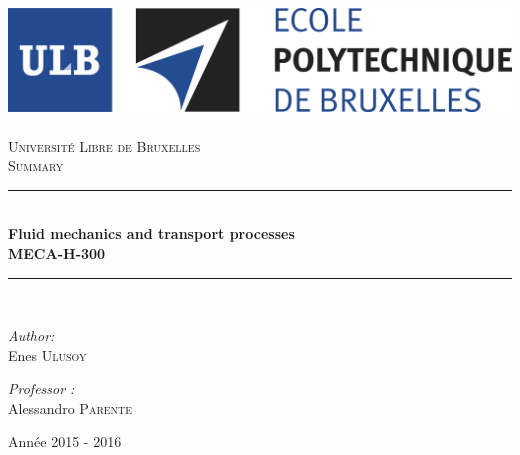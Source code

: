 \AddToShipoutPicture*{\BackgroundPic}
\begin{titlepage}
	\begin{center}	
			
		\newcommand{\HRule}{\rule{\linewidth}{0.5mm}}   			            %
		\includegraphics[scale=0.11]{titlepage/logo.jpg}~\\[1cm]				%
			
			\textsc{\LARGE Université Libre de Bruxelles}\\[1.5cm]
			\textsc{\Large Summary}\\[0.5cm]
			
			\HRule \\[0.4cm]
			{\huge \bfseries Fluid mechanics and transport processes \ \\MECA-H-300 \\[0.4cm] }
			
			
			\HRule \\[1.5cm]
			\begin{minipage}{0.6\textwidth}
				\begin{flushleft} \large
					\emph{Author:}\\
					Enes \textsc{Ulusoy} \\
				\end{flushleft}
			\end{minipage}
			\begin{minipage}{0.25\textwidth}
				\large
				\emph{Professor :}\\
				Alessandro \textsc{Parente}
			\end{minipage}
			
			\vfill
			
			{\large Année 2015 - 2016}
			
		\end{center}
	\end{titlepage}